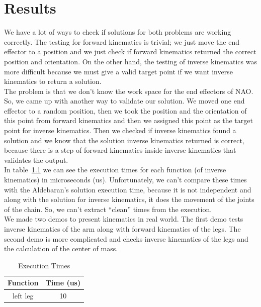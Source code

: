 \chapter{Results}
\label{Results}
We have a lot of ways to check if solutions for both problems are working correctly. The testing for forward kinematics is trivial; we just move the end effector to a position and we just check if forward kinematics returned the correct position and orientation. On the other hand, the testing of inverse kinematics was more difficult because we must give a valid target point if we want inverse kinematics to return a solution.\\
The problem is that we don't know the work space for the end effectors of NAO. So, we came up with another way to validate our solution. We moved one end effector to a random position, then we took the position and the orientation of this point from forward kinematics and then we assigned this point as the target point for inverse kinematics. Then we checked if inverse kinematics found a solution and we know that the solution inverse kinematics returned is correct, because there is a step of forward kinematics inside inverse kinematics that validates the output.\\
In table~\ref{times} we can see the execution times for each function (of inverse kinematics) in microseconds (us). Unfortunately, we can't compare these times with the Aldebaran's solution execution time, because it is not independent and along with the solution for inverse kinematics, it does the movement of the joints of the chain. So, we can't extract ``clean'' times from the execution.\\
We made two demos to present kinematics in real world. The first demo tests inverse kinematics of the arm along with forward kinematics of the legs. The second demo is more complicated and checks inverse kinematics of the legs and the calculation of the center of mass.\\
\begin{table}[!h]
\centering
\caption{Execution Times}
\vspace*{0.06cm}
\begin{tabular}{|c|c|}
\hline
\textbf{Function} & \textbf{Time (us)}\\ \hline
left leg & 10 \\
\hline
\end{tabular}
\label{times}
\end{table}
